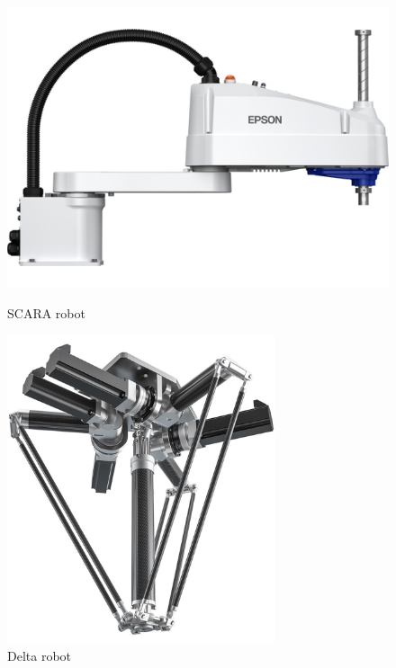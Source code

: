 \begin{figure}[H]	
	\centering
	\begin{minipage}{0.5\textwidth}
		\centering
		\includegraphics[width=1\textwidth]{figures/scara.png}
		\caption{SCARA robot \cite{Scara}}
		\label{Scara}
	\end{minipage}\hfill
	\begin{minipage}{0.5\textwidth}
		\centering
		\includegraphics[width=0.7\textwidth]{figures/delta.png}
		\caption{Delta robot \cite{Delta}}
		\label{Delta}
	\end{minipage}\par
\end{figure}



